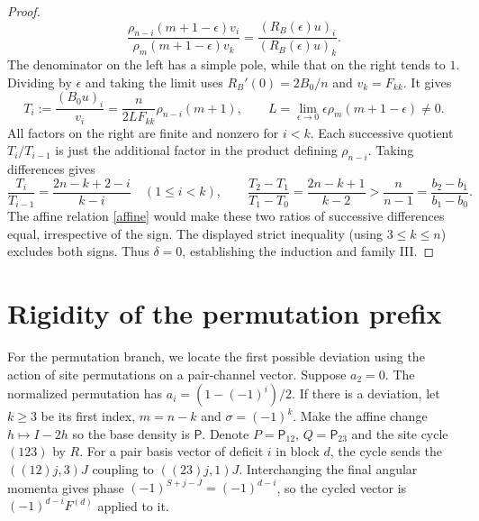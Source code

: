 \documentclass[11pt]{article}
\newcommand{\PP}{\mathsf P}
\begin{document}
\begin{proof}
\[
 \frac{\rho_{n-i}(m+1-\epsilon)v_i}{\rho_m(m+1-\epsilon)v_k}
 =\frac{(R_B(\epsilon)u)_i}{(R_B(\epsilon)u)_k}.
\]
The denominator on the left has a simple pole, while that on the right tends to $1$. Dividing by $\epsilon$ and taking the limit uses $R_B'(0)=2B_0/n$ and $v_k=F_{kk}$. It gives
\begin{equation}\label{rres}
 T_i:=\frac{(B_0u)_i}{v_i}=
 \frac{n}{2L F_{kk}}\rho_{n-i}(m+1),\qquad
 L=\lim_{\epsilon\to0}\epsilon\rho_m(m+1-\epsilon)\ne0.
\end{equation}
All factors on the right are finite and nonzero for $i<k$. Each successive quotient $T_i/T_{i-1}$ is just the additional factor in the product defining $\rho_{n-i}$. Taking differences gives
\[
 \frac{T_i}{T_{i-1}}=\frac{2n-k+2-i}{k-i}\quad(1\le i<k),
 \qquad\frac{T_2-T_1}{T_1-T_0}=\frac{2n-k+1}{k-2}>
 \frac n{n-1}=\frac{b_2-b_1}{b_1-b_0}.
\]
The affine relation \eqref{affine} would make these two ratios of successive differences equal, irrespective of the sign. The displayed strict inequality (using $3\le k\le n$) excludes both signs. Thus $\delta=0$, establishing the induction and family III.
\end{proof}

\section{Rigidity of the permutation prefix}\label{permutation}
For the permutation branch, we locate the first possible deviation using the action of site permutations on a pair-channel vector.
Suppose $a_2=0$. The normalized permutation has $a_i=(1-(-1)^i)/2$. If there is a deviation, let $k\ge3$ be its first index, $m=n-k$ and $\sigma=(-1)^k$. Make the affine change $h\mapsto I-2h$ so the base density is $\PP$. Denote $P=\PP_{12}$, $Q=\PP_{23}$ and the site cycle $(123)$ by $R$. For a pair basis vector of deficit $i$ in block $d$, the cycle sends the $((12)j,3)J$ coupling to $((23)j,1)J$. Interchanging the final angular momenta gives phase $(-1)^{S+j-J}=(-1)^{d-i}$, so the cycled vector is $(-1)^{d-i}F^{(d)}$ applied to it.
\end{document}
